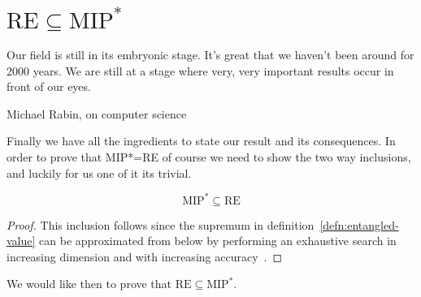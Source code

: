 \section{$\text{RE} \subseteq \text{MIP}^*$}
\epigraph{Our field is still in its embryonic stage. It's great that we haven't been around
for 2000 years. We are still at a stage where very, very important results occur
in front of our eyes.}{Michael Rabin, on computer science}

Finally we have all the ingredients to state our result and its consequences.
In order to prove that MIP*=RE of course we need to show the two way inclusions, and luckily for us one of it its trivial.

\begin{theorem}
    \begin{equation}
    \text{MIP}^{*} \subseteq \text{RE} 
    \end{equation}
\end{theorem}
\begin{proof}
    This inclusion follows since the supremum in definition~\ref{defn:entangled-value} can be approximated from below by performing an exhaustive search in increasing dimension and with increasing accuracy~\cite{mipre}.
\end{proof}
We would like then to prove that $\text{RE} \subseteq \text{MIP}^{*}$.
 